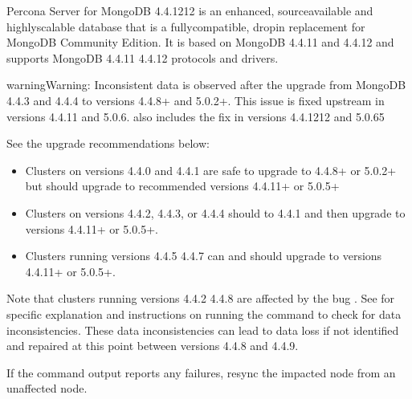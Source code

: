 \documentclass[letterpaper,10pt,english]{sphinxmanual}
\begin{document}
\sphinxAtStartPar
Percona Server for MongoDB 4.4.12\sphinxhyphen{}12 is an enhanced, source\sphinxhyphen{}available and highly\sphinxhyphen{}scalable database that is a
fully\sphinxhyphen{}compatible, drop\sphinxhyphen{}in replacement for MongoDB Community Edition.
It is based on MongoDB 4.4.11 and 4.4.12 and supports MongoDB 4.4.11 \sphinxhyphen{} 4.4.12 protocols and drivers.

\begin{sphinxadmonition}{warning}{Warning:}
\sphinxAtStartPar
Inconsistent data is observed after the upgrade from MongoDB 4.4.3 and 4.4.4 to versions 4.4.8+ and 5.0.2+.
This issue is fixed upstream in versions 4.4.11 and 5.0.6.  also includes the fix in versions 4.4.12\sphinxhyphen{}12 and 5.0.6\sphinxhyphen{}5

\sphinxAtStartPar
See the upgrade recommendations below:
\begin{itemize}
\item {} 
\sphinxAtStartPar
Clusters on versions 4.4.0 and 4.4.1 are safe to upgrade to 4.4.8+ or 5.0.2+ but should upgrade to recommended versions 4.4.11+ or 5.0.5+

\item {} 
\sphinxAtStartPar
Clusters on versions 4.4.2, 4.4.3, or 4.4.4 should  to 4.4.1 and then upgrade to versions  4.4.11+ or 5.0.5+.

\item {} 
\sphinxAtStartPar
Clusters running versions 4.4.5 \sphinxhyphen{} 4.4.7 can and should upgrade to versions 4.4.11+ or 5.0.5+.

\end{itemize}

\sphinxAtStartPar
Note that clusters running versions 4.4.2 \sphinxhyphen{} 4.4.8 are affected by the bug . See  for specific explanation and instructions on running the  command to check for data inconsistencies. These data inconsistencies can lead to data loss if not identified and repaired at this point between versions 4.4.8 and 4.4.9.

\sphinxAtStartPar
If the   command output reports any failures, resync the impacted node from an unaffected node.   
\end{sphinxadmonition}
\end{document}
